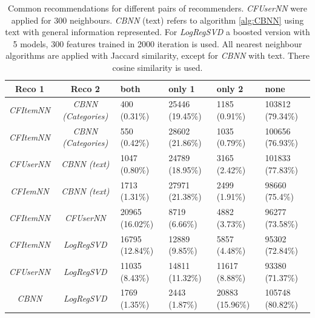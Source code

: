 \documentclass[10pt]{reportMaster}
\begin{document}
\begin{table}
	\begin{tabular}{|c|c||p{1.2cm}|p{1.2cm}|p{1.2cm}|p{1.2cm}|}
		\hline
		\textbf{Reco 1}&\textbf{Reco 2}&\textbf{both}&\textbf{only 1}&\textbf{only 2}&\textbf{none}\\ \hline
		\textit{CFItemNN}&\textit{CBNN (Categories)}&400 (0.31\%)&25446 (19.45\%)&1185 (0.91\%)&103812 (79.34\%)\\ \hline
		\textit{CFItemNN}&\textit{CBNN (Categories)}&550 (0.42\%)&28602 (21.86\%)&1035 (0.79\%)&100656 (76.93\%) \\ \hline
		\textit{CFUserNN}&\textit{CBNN (text)}&1047 (0.80\%)&24789 (18.95\%)&3165 (2.42\%)&101833 (77.83\%) \\ \hline
		\textit{CFIemNN}&\textit{CBNN (text)}&1713 (1.31\%)&27971 (21.38\%)&2499 (1.91\%)&98660 (75.4\%) \\ \hline
		\textit{CFItemNN}&\textit{CFUserNN}&20965 (16.02\%)&8719 (6.66\%)&4882 (3.73\%)&96277 (73.58\%) \\ \hline
		\textit{CFItemNN}&\textit{LogRegSVD}&16795 (12.84\%)&12889 (9.85\%)&5857 (4.48\%)&95302 (72.84\%) \\ \hline
		\textit{CFUserNN}&\textit{LogRegSVD}&11035 (8.43\%)&14811 (11.32\%)&11617 (8.88\%)&93380 (71.37\%) \\ \hline
		 \textit{CBNN}&\textit{LogRegSVD}&1769 (1.35\%)&2443 (1.87\%)&20883 (15.96\%)&105748 (80.82\%)\\ \hline
	\end{tabular}
	\caption{Common recommendations for different pairs of recommenders. \textit{CFUserNN} were applied for 300 neighbours. \textit{CBNN} (text) refers to algorithm \ref{alg:CBNN} using text with general information represented. For \textit{LogRegSVD} a boosted version with 5 models, 300 features trained in 2000 iteration is used. All nearest neighbour algorithms are applied with Jaccard similarity, except for \textit{CBNN} with text. There cosine similarity is used.}
\label{tab:correlation}
\end{table}
\end{document}
